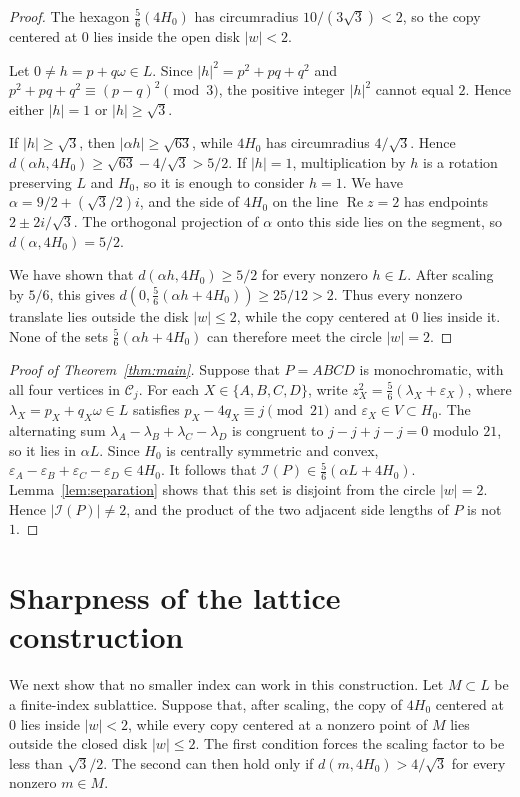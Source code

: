 \documentclass[12pt,reqno]{amsart}
\theoremstyle{remark}
\theoremstyle{definition}
\numberwithin{equation}{section}
\begin{document}
\begin{proof}
The hexagon $\frac{5}{6}(4H_0)$ has circumradius $10/(3\sqrt3)<2$, so the copy centered at $0$ lies inside the open disk $|w|<2$.

Let $0\ne h=p+q\omega\in L$. Since $|h|^2=p^2+pq+q^2$ and $p^2+pq+q^2\equiv(p-q)^2\pmod3$, the positive integer $|h|^2$ cannot equal $2$. Hence either $|h|=1$ or $|h|\ge\sqrt3$.

If $|h|\ge\sqrt3$, then $|\alpha h|\ge\sqrt{63}$, while $4H_0$ has circumradius $4/\sqrt3$. Hence $d(\alpha h,4H_0)\ge\sqrt{63}-4/\sqrt3>5/2$.
If $|h|=1$, multiplication by $h$ is a rotation preserving $L$ and $H_0$, so it is enough to consider $h=1$. We have $\alpha=9/2+(\sqrt3/2)i$, and the side of $4H_0$ on the line $\operatorname{Re}z=2$ has endpoints $2\pm2i/\sqrt3$. The orthogonal projection of $\alpha$ onto this side lies on the segment, so $d(\alpha,4H_0)=5/2$.

We have shown that $d(\alpha h,4H_0)\ge5/2$ for every nonzero $h\in L$. After scaling by $5/6$, this gives $d(0,\frac{5}{6}(\alpha h+4H_0))\ge25/12>2$. Thus every nonzero translate lies outside the disk $|w|\le2$, while the copy centered at $0$ lies inside it. None of the sets $\frac{5}{6}(\alpha h+4H_0)$ can therefore meet the circle $|w|=2$.
\end{proof}

\begin{proof}[Proof of Theorem~\ref{thm:main}]
Suppose that $P=ABCD$ is monochromatic, with all four vertices in $\mathscr C_j$. For each $X\in\{A,B,C,D\}$, write $z_X^2=\frac{5}{6}(\lambda_X+\varepsilon_X)$, where $\lambda_X=p_X+q_X\omega\in L$ satisfies $p_X-4q_X\equiv j\pmod{21}$ and $\varepsilon_X\in V\subset H_0$. The alternating sum $\lambda_A-\lambda_B+\lambda_C-\lambda_D$ is congruent to $j-j+j-j=0$ modulo $21$, so it lies in $\alpha L$. Since $H_0$ is centrally symmetric and convex, $\varepsilon_A-\varepsilon_B+\varepsilon_C-\varepsilon_D\in4H_0$.
It follows that $\mathscr I(P)\in\frac{5}{6}(\alpha L+4H_0)$. Lemma~\ref{lem:separation} shows that this set is disjoint from the circle $|w|=2$. Hence $|\mathscr I(P)|\ne2$, and the product of the two adjacent side lengths of $P$ is not $1$.
\end{proof}

\section{Sharpness of the lattice construction}

We next show that no smaller index can work in this construction. Let $M\subset L$ be a finite-index sublattice. Suppose that, after scaling, the copy of $4H_0$ centered at $0$ lies inside $|w|<2$, while every copy centered at a nonzero point of $M$ lies outside the closed disk $|w|\le2$. The first condition forces the scaling factor to be less than $\sqrt3/2$. The second can then hold only if $d(m,4H_0)>4/\sqrt3$ for every nonzero $m\in M$.
\end{document}

